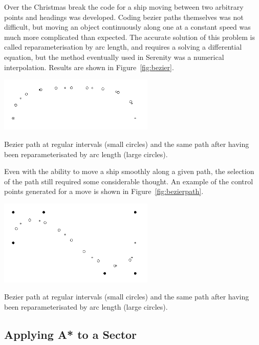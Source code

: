 Over the Christmas break the code for a ship moving between two arbitrary points and headings was developed. Coding bezier paths themselves was not difficult, but moving an object continuously along one at a constant speed was much more complicated than expected. The accurate solution of this problem is called reparameterisation by arc length, and requires a solving a differential equation, but the method eventually used in Serenity was a numerical interpolation. Results are shown in Figure~\ref{fig:bezier}.

\begin{marginfigure}
	\includegraphics[width=20em]{res/pathfinding/bezier}
	\caption[Bezier path at regular intervals]{Bezier path at regular intervals (small circles) and the same path after having been reparameterisated by arc length (large circles).}
	\label{fig:bezier}
\end{marginfigure}

Even with the ability to move a ship smoothly along a given path, the selection of the path still required some considerable thought. An example of the control points generated for a move is shown in Figure~\ref{fig:bezierpath}.

\begin{marginfigure}
	\includegraphics[width=20em]{res/pathfinding/bezierpath}
	\caption[Bezier path at regular intervals]{Bezier path at regular intervals (small circles) and the same path after having been reparameterisated by arc length (large circles).}
	\label{fig:bezierpath}
\end{marginfigure}

\subsection{Applying A* to a Sector}

